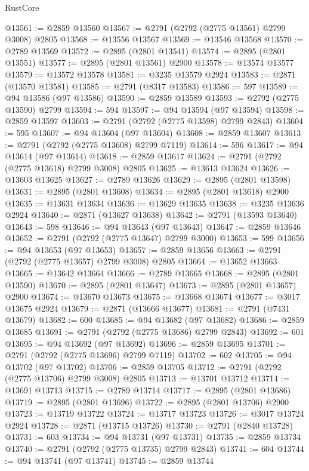 \begin{lexlean}{RustCore}
\begin{coremodule}
@13561 := @2859 @13560
@13567 := @2791 (@2792 (@2775 @13561) @2799 @3008) @2805
@13568 := @13556 @13567
@13569 := @13546 @13568
@13570 := @2789 @13569
@13572 := @2895 (@2801 @13541)
@13574 := @2895 (@2801 @13551)
@13577 := @2895 (@2801 @13561) @2900
@13578 := @13574 @13577
@13579 := @13572 @13578
@13581 := @3235 @13579 @2924
@13583 := @2871 (@13570 @13581)
@13585 := @2791 (@8317 @13583)
@13586 := 597
@13589 := @94 @13586 (@97 @13586)
@13590 := @2859 @13589
@13593 := @2792 (@2775 @13590) @2799
@13594 := 594
@13597 := @94 @13594 (@97 @13594)
@13598 := @2859 @13597
@13603 := @2791 (@2792 (@2775 @13598) @2799 @2843)
@13604 := 595
@13607 := @94 @13604 (@97 @13604)
@13608 := @2859 @13607
@13613 := @2791 (@2792 (@2775 @13608) @2799 @7119)
@13614 := 596
@13617 := @94 @13614 (@97 @13614)
@13618 := @2859 @13617
@13624 := @2791 (@2792 (@2775 @13618) @2799 @3008) @2805
@13625 := @13613 @13624
@13626 := @13603 @13625
@13627 := @2789 @13626
@13629 := @2895 (@2801 @13598)
@13631 := @2895 (@2801 @13608)
@13634 := @2895 (@2801 @13618) @2900
@13635 := @13631 @13634
@13636 := @13629 @13635
@13638 := @3235 @13636 @2924
@13640 := @2871 (@13627 @13638)
@13642 := @2791 (@13593 @13640)
@13643 := 598
@13646 := @94 @13643 (@97 @13643)
@13647 := @2859 @13646
@13652 := @2791 (@2792 (@2775 @13647) @2799 @3000)
@13653 := 599
@13656 := @94 @13653 (@97 @13653)
@13657 := @2859 @13656
@13663 := @2791 (@2792 (@2775 @13657) @2799 @3008) @2805
@13664 := @13652 @13663
@13665 := @13642 @13664
@13666 := @2789 @13665
@13668 := @2895 (@2801 @13590)
@13670 := @2895 (@2801 @13647)
@13673 := @2895 (@2801 @13657) @2900
@13674 := @13670 @13673
@13675 := @13668 @13674
@13677 := @3017 @13675 @2924
@13679 := @2871 (@13666 @13677)
@13681 := @2791 (@7431 @13679)
@13682 := 600
@13685 := @94 @13682 (@97 @13682)
@13686 := @2859 @13685
@13691 := @2791 (@2792 (@2775 @13686) @2799 @2843)
@13692 := 601
@13695 := @94 @13692 (@97 @13692)
@13696 := @2859 @13695
@13701 := @2791 (@2792 (@2775 @13696) @2799 @7119)
@13702 := 602
@13705 := @94 @13702 (@97 @13702)
@13706 := @2859 @13705
@13712 := @2791 (@2792 (@2775 @13706) @2799 @3008) @2805
@13713 := @13701 @13712
@13714 := @13691 @13713
@13715 := @2789 @13714
@13717 := @2895 (@2801 @13686)
@13719 := @2895 (@2801 @13696)
@13722 := @2895 (@2801 @13706) @2900
@13723 := @13719 @13722
@13724 := @13717 @13723
@13726 := @3017 @13724 @2924
@13728 := @2871 (@13715 @13726)
@13730 := @2791 (@2840 @13728)
@13731 := 603
@13734 := @94 @13731 (@97 @13731)
@13735 := @2859 @13734
@13740 := @2791 (@2792 (@2775 @13735) @2799 @2843)
@13741 := 604
@13744 := @94 @13741 (@97 @13741)
@13745 := @2859 @13744

\end{coremodule}
\end{lexlean}
